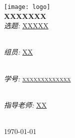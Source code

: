 \documentclass[10pt,a4paper]{article}
\begin{document}
	\begin{titlepage}
		
		\begin{center}
			
			
			\texttt{[image: logo]}\\%
			
			
			
			
			{ \huge \bfseries XXXXXXX}\\[4cm]

			
					\emph{\Large 选题:}  \textsc{\Large \underline{XXXXX}}\\\
					
					\emph{\Large 组员:}  \textsc{\Large \underline{XX} }\\\
					
					\emph{\Large 学号:}  \textsc{\underline{xxxxxxxxxxxxx} }\\\
					
					\emph{\Large 指导老师:}  \textsc{\Large \underline{XX} }\\\
%			
			\vfill
			
			{\large \today}
			
		\end{center}
		
	\end{titlepage}
	
\end{document}

